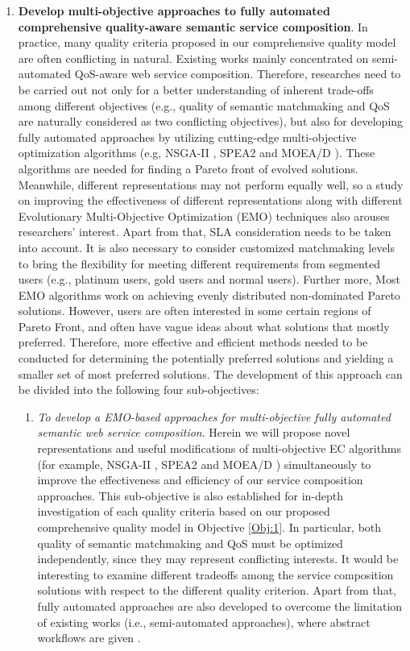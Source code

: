 \begin{enumerate}
 \item \label{Obj:2} \textbf{Develop multi-objective approaches to fully automated comprehensive quality-aware semantic service composition}. In practice, many quality criteria proposed in our comprehensive quality model are often conflicting in natural. Existing works \cite{chen2014partial,xiang2014qos,yin2014hybrid,liu2005dynamic,yu2013efficient,zhang2010qos} mainly concentrated on semi-automated QoS-aware web service composition. Therefore, researches need to be carried out not only for a better understanding of inherent trade-offs among different objectives (e.g., quality of semantic matchmaking and QoS are naturally considered as two conflicting objectives), but also for developing fully automated approaches by utilizing cutting-edge multi-objective optimization algorithms (e.g, NSGA-II \cite{deb2002fast}, SPEA2 \cite{zitzler2001spea2} and MOEA/D \cite{zhang2007moea}). These algorithms are needed for finding a Pareto front of evolved solutions. Meanwhile, different representations may not perform equally well, so a study on improving the effectiveness of different representations along with different Evolutionary Multi-Objective Optimization (EMO) techniques also arouses researchers' interest. Apart from that, SLA consideration needs to be taken into account. It is also necessary to consider customized matchmaking levels to bring the flexibility for meeting different requirements from segmented users (e.g., platinum users, gold users and normal users). Further more, Most EMO algorithms work on achieving evenly distributed non-dominated Pareto solutions. However, users are often interested in some certain regions of Pareto Front, and often have vague ideas about what solutions that mostly preferred. Therefore, more effective and efficient methods needed to be conducted for determining the potentially preferred solutions and yielding a smaller set of most preferred solutions. The development of this approach can be divided into the following four sub-objectives:
   \begin{enumerate}
   
    \item \label{Obj:2.1} \emph{To develop a EMO-based approaches for multi-objective fully automated semantic web service composition}. Herein we will propose novel representations and useful modifications of multi-objective EC algorithms (for example, NSGA-II \cite{deb2002fast}, SPEA2 \cite{zitzler2001spea2} and MOEA/D \cite{zhang2007moea}) simultaneously to improve the effectiveness and efficiency of our service composition approaches. This sub-objective is also established for in-depth investigation of each quality criteria based on our proposed comprehensive quality model in Objective \ref{Obj:1}.  In particular, both quality of semantic matchmaking and QoS must be optimized independently, since they may represent conflicting interests. It would be interesting to examine different tradeoffs among the service composition solutions with respect to the different quality criterion. Apart from that, fully automated approaches are also developed to overcome the limitation of existing works (i.e., semi-automated approaches), where abstract workflows are given .
   

\end{enumerate}
\end{enumerate}
